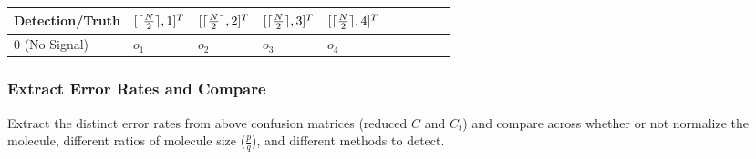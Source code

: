 \documentclass[11pt]{article}
\DeclarePairedDelimiter{\ceil}{\lceil}{\rceil}
\begin{document}
\begin{enumerate}
\begin{enumerate}
                \begin{tabular}{l|l|l|l|l|l|l|l|l|l}
                    Detection/Truth&$[\ceil{\frac{N}{2}}, 1]^T$&$[\ceil{\frac{N}{2}}, 2]^T$&$[\ceil{\frac{N}{2}}, 3]^T$&$[\ceil{\frac{N}{2}}, 4]^T$\\\hline
                    $0$ (No Signal)&$o_1$&$o_2$&$o_3$&$o_4$\\\hline
                \end{tabular}
                
            \end{enumerate}
            
        \end{enumerate}
    
    
    \subsubsection{Extract Error Rates and Compare}
    Extract the distinct error rates from above confusion matrices (reduced $C$ and $C_t$) and compare across whether or not normalize the molecule, different ratios of molecule size ($\frac{p}{q}$), and different methods to detect.
    
\end{document}

